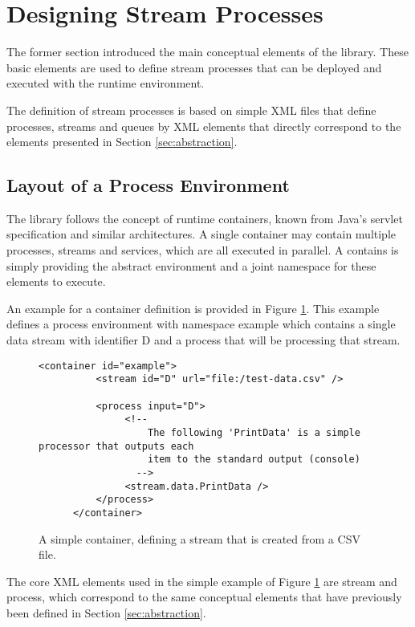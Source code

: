 \section{\label{sec:processDesign}Designing Stream Processes}
The former section introduced the main conceptual elements of the \streams library.
These basic elements are used to define stream processes that can be deployed and
executed with the \streams runtime environment.

The definition of stream processes is based on simple XML files that define processes,
streams and queues by XML elements that directly correspond to the elements presented
in Section \ref{sec:abstraction}.


\subsection{Layout of a Process Environment}
The \streams library follows the concept of runtime containers, known from Java's
servlet specification and similar architectures. A single container may contain
multiple processes, streams and services, which are all executed in parallel. A
contains is simply providing the abstract environment and a joint namespace for
these elements to execute.

An example for a container definition is provided in Figure \ref{fig:simpleContainer}.
This example defines a process environment with namespace {\ttfamily example} which
contains a single data stream with identifier {\ttfamily D} and a process that will
be processing that stream.

\begin{figure}[h!]
	\begin{lstlisting}[showstringspaces=false]
      <container id="example">
          <stream id="D" url="file:/test-data.csv" />

          <process input="D">
               <!--
                   The following 'PrintData' is a simple processor that outputs each
                   item to the standard output (console)
                 -->
               <stream.data.PrintData />
          </process>
      </container>
	\end{lstlisting}
	\caption{\label{fig:simpleContainer}A simple container, defining a stream that is created from a CSV file.}
\end{figure}

The core XML elements used in the simple example of Figure \ref{fig:simpleContainer}
are {\ttfamily stream} and {\ttfamily process}, which correspond to the same 
conceptual elements that have previously been defined in Section \ref{sec:abstraction}.

